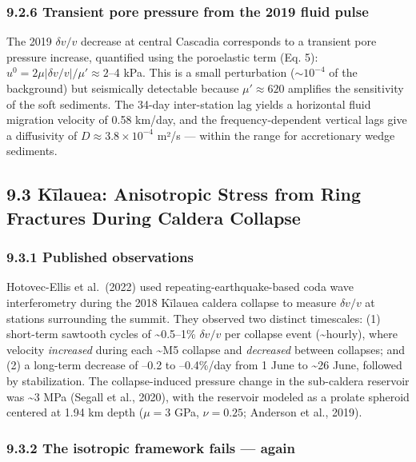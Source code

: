 \documentclass[12pt]{article}
\begin{document}
\subsubsection{9.2.6 Transient pore pressure from the 2019 fluid
pulse}\label{transient-pore-pressure-from-the-2019-fluid-pulse}

The 2019 \(\delta v/v\) decrease at central Cascadia corresponds to a
transient pore pressure increase, quantified using the poroelastic term
(Eq. 5): \(u^0 = 2\mu|\delta v/v|/\mu' \approx 2\)--4 kPa. This is a
small perturbation (\(\sim 10^{-4}\) of the background) but seismically
detectable because \(\mu' \approx 620\) amplifies the sensitivity of the
soft sediments. The 34-day inter-station lag yields a horizontal fluid
migration velocity of 0.58 km/day, and the frequency-dependent vertical
lags give a diffusivity of \(D \approx 3.8 \times 10^{-4}\) m²/s ---
within the range for accretionary wedge sediments.

\subsection{9.3 Kīlauea: Anisotropic Stress from Ring Fractures During
Caldera
Collapse}\label{kux12blauea-anisotropic-stress-from-ring-fractures-during-caldera-collapse}

\subsubsection{9.3.1 Published
observations}\label{published-observations-2}

Hotovec-Ellis et al.~(2022) used repeating-earthquake-based coda wave
interferometry during the 2018 Kīlauea caldera collapse to measure
\(\delta v/v\) at stations surrounding the summit. They observed two
distinct timescales: (1) short-term sawtooth cycles of
\textasciitilde0.5--1\% \(\delta v/v\) per collapse event
(\textasciitilde hourly), where velocity \emph{increased} during each
\textasciitilde M5 collapse and \emph{decreased} between collapses; and
(2) a long-term decrease of --0.2 to --0.4\%/day from 1 June to
\textasciitilde26 June, followed by stabilization. The collapse-induced
pressure change in the sub-caldera reservoir was \textasciitilde3 MPa
(Segall et al., 2020), with the reservoir modeled as a prolate spheroid
centered at 1.94 km depth (\(\mu = 3\) GPa, \(\nu = 0.25\); Anderson et
al., 2019).

\subsubsection{9.3.2 The isotropic framework fails ---
again}\label{the-isotropic-framework-fails-again}
\end{document}
